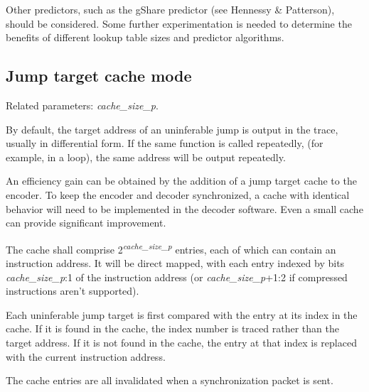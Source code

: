Other predictors, such as the gShare predictor (see Hennessy \& Patterson), should be considered.  Some further
experimentation is needed to determine the benefits of different lookup table sizes and predictor algorithms.


\subsection{Jump target cache mode} \label{sec:jump-cache}

Related parameters: \textit{cache\_size\_p}.

By default, the target address of an uninferable jump is output in the trace, usually in differential
form.  If the same function is called repeatedly, (for example, in a loop), the same address will be output 
repeatedly.  

An efficiency gain can be obtained by the addition of a jump target cache to the encoder.  To keep
the encoder and decoder synchronized, a cache with identical behavior will need to be implemented in the 
decoder software.  Even a small cache can provide significant improvement.

The cache shall comprise 2\textsuperscript{\textit{cache\_size\_p}} entries, each of which can contain
an instruction address.  It will be direct mapped, with each entry indexed by bits \textit{cache\_size\_p}:1 
of the instruction address (or \textit{cache\_size\_p}+1:2 if compressed instructions aren't supported).   

Each uninferable jump target is first compared with the entry at its index in the cache.  If it is 
found in the cache, the index number is traced rather than the target address.  If it is not found in 
the cache, the entry at that index is replaced with the current instruction address.

The cache entries are all invalidated when a synchronization packet is sent.  


